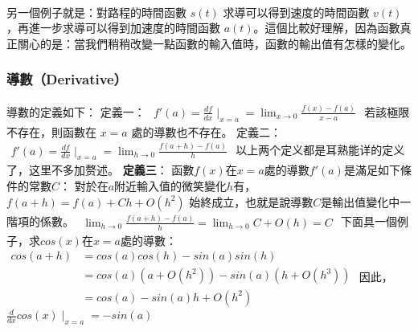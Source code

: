 \documentclass[11pt]{article}
\begin{document}
    \begin{center}
    \end{center}
    { \hspace*{\fill} \\}
    
    另一個例子就是：對路程的時間函數 \(s(t)\) 求導可以得到速度的時間函數
\(v(t)\)，再進一步求導可以得到加速度的時間函數
\(a(t)\)。這個比較好理解，因為函數真正關心的是：當我們稍稍改變一點函數的輸入值時，函數的輸出值有怎樣的變化。

    \hypertarget{ux5c0eux6578derivative}{%
\subsubsection{導數（Derivative）}\label{ux5c0eux6578derivative}}

導數的定義如下： 定義一：
\(\begin{align*}f'(a) = \frac{df}{dx}\mid_{x=a} = \lim_{x\rightarrow 0} \frac{f(x)-f(a)}{x-a}\end{align*}\)
若該極限不存在，則函數在 \(x=a\) 處的導數也不存在。 定義二：
\(\begin{align*}f'(a) = \frac{df}{dx}\mid_{x=a} = \lim_{h\rightarrow 0} \frac{f(a+h)-f(a)}{h}\end{align*}\)
以上两个定义都是耳熟能详的定义了，这里不多加赘述。 \textbf{定義三}：
函數\(f(x)\)在\(x=a\)處的導數\(f'(a)\)是滿足如下條件的常數\(C\)：
對於在\(a\)附近輸入值的微笑變化\(h\)有，\(f(a+h)=f(a) + Ch + O(h^2)\)
始終成立，也就是說導數\(C\)是輸出值變化中一階項的係數。
\(\begin{align*} \lim_{h\rightarrow 0} \frac{f(a+h)-f(a)}{h} = \lim_{h\rightarrow 0} C + O(h) = C \end{align*}\)
下面具一個例子，求\(cos(x)\)在\(x=a\)處的導數：
\(\begin{align*} cos(a+h) &= cos(a)cos(h) - sin(a)sin(h)\\&=cos(a)(a+O(h^2)) - sin(a)(h+O(h^3))\\&=cos(a)-sin(a)h+O(h^2)\end{align*}\)
因此，\(\frac{d}{dx}cos(x)\mid_{x=a} = -sin(a)\)
\end{document}
